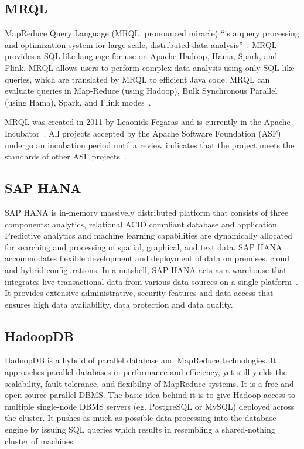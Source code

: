 \subsection{MRQL}

MapReduce Query Language (MRQL, pronounced miracle) ``is a query
processing and optimization system for large-scale, distributed data
analysis''~\cite{www-apachemrql}. MRQL provides a SQL like language
for use on Apache Hadoop, Hama, Spark, and Flink.  MRQL allows users
to perform complex data analysis using only SQL like queries, which
are translated by MRQL to efficient Java code. MRQL can evaluate
queries in Map-Reduce (using Hadoop), Bulk Synchronous Parallel (using
Hama), Spark, and Flink modes~\cite{www-apachemrql}.

MRQL was created in 2011 by Leaonids Fegaras and is currently in the
Apache Incubator~\cite{www-mrqlhadoop}.  All projects accepted by the
Apache Software Foundation (ASF) undergo an incubation period until a
review indicates that the project meets the standards of other ASF
projects~\cite{www-apacheincubator}.

     \pv

\subsection{SAP HANA}

SAP HANA is in-memory massively distributed platform that consists of
three components: analytics, relational ACID compliant database and
application\cite{www-sap-hana}. Predictive analytics and machine
learning capabilities are dynamically allocated for searching and
processing of spatial, graphical, and text data.  SAP HANA
accommodates flexible development and deployment of data on premises,
cloud and hybrid configurations.  In a nutshell, SAP HANA acts as a
warehouse that integrates live transactional data from various data
sources on a single platform~\cite{olofson-2014}. It provides
extensive administrative, security features and data access that
ensures high data availability, data protection and data quality.

     \pv
	 

\subsection{HadoopDB}
    
HadoopDB is a hybrid of parallel database and MapReduce
technologies. It approaches parallel databases in performance and
efficiency, yet still yields the scalability, fault tolerance, and
flexibility of MapReduce systems. It is a free and open source
parallel DBMS. The basic idea behind it is to give Hadoop access to
multiple single-node DBMS servers (eg. PostgreSQL or MySQL) deployed
across the cluster. It pushes as much as possible data processing into
the database engine by issuing SQL queries which results in resembling
a shared-nothing cluster of machines~\cite{www-hadoopdb}.


